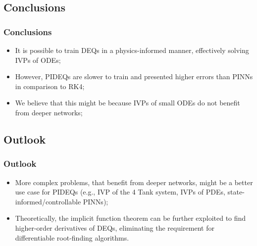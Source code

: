 \documentclass[t]{beamer}
\begin{document}
\subsection{Conclusions}

\begin{frame}
    \frametitle{Conclusions}
    \begin{itemize}[label={\textbullet}]
        \item<1-> It is possible to train DEQs in a physics-informed manner, effectively solving IVPs of ODEs;
	\item<2-> However, PIDEQs are slower to train and presented higher errors than PINNs in comparison to RK4;
	\item<3-> We believe that this might be because IVPs of small ODEs do not benefit from deeper networks;
    \end{itemize}
\end{frame}

\subsection{Outlook}

\begin{frame}
    \frametitle{Outlook}
    \begin{itemize}[label={\textbullet}]
        \item<1-> More complex problems, that benefit from deeper networks, might be a better use case for PIDEQs (e.g., IVP of the 4 Tank system, IVPs of PDEs, state-informed/controllable PINNs);
	\item<2-> Theoretically, the implicit function theorem can be further exploited to find higher-order derivatives of DEQs, eliminating the requirement for differentiable root-finding algorithms.
    \end{itemize}
\end{frame}

\end{document}
